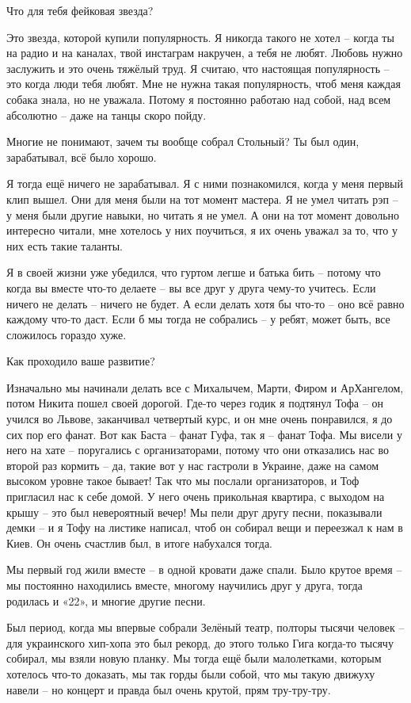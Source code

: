 Что для тебя фейковая звезда?

Это звезда, которой купили популярность. Я никогда такого не хотел – когда ты на радио и на каналах, твой инстаграм накручен, а тебя не любят. Любовь нужно заслужить и это очень тяжёлый труд. Я считаю, что настоящая популярность – это когда люди тебя любят. Мне не нужна такая популярность, чтоб меня каждая собака знала, но не уважала. Потому я постоянно работаю над собой, над всем абсолютно – даже на танцы скоро пойду.

Многие не понимают, зачем ты вообще собрал Стольный? Ты был один, зарабатывал, всё было хорошо.

Я тогда ещё ничего не зарабатывал. Я с ними познакомился, когда у меня первый клип вышел. Они для меня были на тот момент мастера. Я не умел читать рэп – у меня были другие навыки, но читать я не умел. А они на тот момент довольно интересно читали, мне хотелось у них поучиться, я их очень уважал за то, что у них есть такие таланты.

Я в своей жизни уже убедился, что гуртом легше и батька бить – потому что когда вы вместе что-то делаете – вы все друг у друга чему-то учитесь. Если ничего не делать – ничего не будет. А если делать хотя бы что-то – оно всё равно каждому что-то даст. Если б мы тогда не собрались – у ребят, может быть, все сложилось гораздо хуже.

Как проходило ваше развитие?

Изначально мы начинали делать все с Михалычем, Марти, Фиром и АрХангелом, потом Никита пошел своей дорогой. Где-то через годик я подтянул Тофа – он учился во Львове, заканчивал четвертый курс, и он мне очень понравился, я до сих пор его фанат. Вот как Баста – фанат Гуфа, так я – фанат Тофа. Мы висели у него на хате – поругались с организаторами, потому что они отказались нас во второй раз кормить – да, такие вот у нас гастроли в Украине, даже на самом высоком уровне такое бывает! Так что мы послали организаторов, и Тоф пригласил нас к себе домой. У него очень прикольная квартира, с выходом на крышу – это был невероятный вечер! Мы пели друг другу песни, показывали демки – и я Тофу на листике написал, чтоб он собирал вещи и переезжал к нам в Киев. Он очень счастлив был, в итоге набухался тогда.

Мы первый год жили вместе – в одной кровати даже спали. Было крутое время – мы постоянно находились вместе, многому научились друг у друга, тогда родилась и «22», и многие другие песни.

Был период, когда мы впервые собрали Зелёный театр, полторы тысячи человек – для украинского хип-хопа это был рекорд, до этого только Гига когда-то тысячу собирал, мы взяли новую планку. Мы тогда ещё были малолетками, которым хотелось что-то доказать, мы так горды были собой, что мы такую движуху навели – но концерт и правда был очень крутой, прям тру-тру-тру.

